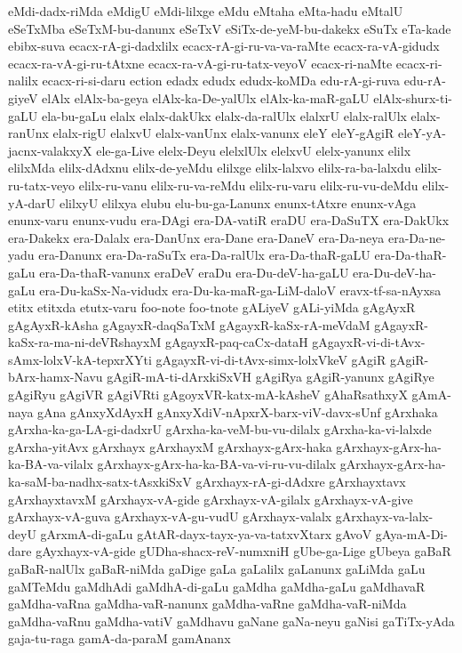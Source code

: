 {eMdi-dadx-riMda
eMdigU
eMdi-lilxge
eMdu
eMtaha
eMta-hadu
eMtalU
eSeTxMba
eSeTxM-bu-danunx
eSeTxV
eSiTx-de-yeM-bu-dakekx
eSuTx
eTa-kade
ebibx-suva
ecacx-rA-gi-dadxlilx
ecacx-rA-gi-ru-va-va-raMte
ecacx-ra-vA-gidudx
ecacx-ra-vA-gi-ru-tAtxne
ecacx-ra-vA-gi-ru-tatx-veyoV
ecacx-ri-naMte
ecacx-ri-nalilx
ecacx-ri-si-daru
ection
edadx
edudx
edudx-koMDa
edu-rA-gi-ruva
edu-rA-giyeV
elAlx
elAlx-ba-geya
elAlx-ka-De-yalUlx
elAlx-ka-maR-gaLU
elAlx-shurx-ti-gaLU
ela-bu-gaLu
elalx
elalx-dakUkx
elalx-da-ralUlx
elalxrU
elalx-ralUlx
elalx-ranUnx
elalx-rigU
elalxvU
elalx-vanUnx
elalx-vanunx
eleY
eleY-gAgiR
eleY-yA-jacnx-valakxyX
ele-ga-Live
elelx-Deyu
elelxlUlx
elelxvU
elelx-yanunx
elilx
elilxMda
elilx-dAdxnu
elilx-de-yeMdu
elilxge
elilx-lalxvo
elilx-ra-ba-lalxdu
elilx-ru-tatx-veyo
elilx-ru-vanu
elilx-ru-va-reMdu
elilx-ru-varu
elilx-ru-vu-deMdu
elilx-yA-darU
elilxyU
elilxya
elubu
elu-bu-ga-Lanunx
enunx-tAtxre
enunx-vAga
enunx-varu
enunx-vudu
era-DAgi
era-DA-vatiR
eraDU
era-DaSuTX
era-DakUkx
era-Dakekx
era-Dalalx
era-DanUnx
era-Dane
era-DaneV
era-Da-neya
era-Da-ne-yadu
era-Danunx
era-Da-raSuTx
era-Da-ralUlx
era-Da-thaR-gaLU
era-Da-thaR-gaLu
era-Da-thaR-vanunx
eraDeV
eraDu
era-Du-deV-ha-gaLU
era-Du-deV-ha-gaLu
era-Du-kaSx-Na-vidudx
era-Du-ka-maR-ga-LiM-daloV
eravx-tf-sa-nAyxsa
etitx
etitxda
etutx-varu
foo-note
foo-tnote
gALiyeV
gALi-yiMda
gAgAyxR
gAgAyxR-kAsha
gAgayxR-daqSaTxM
gAgayxR-kaSx-rA-meVdaM
gAgayxR-kaSx-ra-ma-ni-deVRshayxM
gAgayxR-paq-caCx-dataH
gAgayxR-vi-di-tAvx-sAmx-lolxV-kA-tepxrXYti
gAgayxR-vi-di-tAvx-simx-lolxVkeV
gAgiR
gAgiR-bArx-hamx-Navu
gAgiR-mA-ti-dArxkiSxVH
gAgiRya
gAgiR-yanunx
gAgiRye
gAgiRyu
gAgiVR
gAgiVRti
gAgoyxVR-katx-mA-kAsheV
gAhaRsathxyX
gAmA-naya
gAna
gAnxyXdAyxH
gAnxyXdiV-nApxrX-barx-viV-davx-sUnf
gArxhaka
gArxha-ka-ga-LA-gi-dadxrU
gArxha-ka-veM-bu-vu-dilalx
gArxha-ka-vi-lalxde
gArxha-yitAvx
gArxhayx
gArxhayxM
gArxhayx-gArx-haka
gArxhayx-gArx-ha-ka-BA-va-vilalx
gArxhayx-gArx-ha-ka-BA-va-vi-ru-vu-dilalx
gArxhayx-gArx-ha-ka-saM-ba-nadhx-satx-tAsxkiSxV
gArxhayx-rA-gi-dAdxre
gArxhayxtavx
gArxhayxtavxM
gArxhayx-vA-gide
gArxhayx-vA-gilalx
gArxhayx-vA-give
gArxhayx-vA-guva
gArxhayx-vA-gu-vudU
gArxhayx-valalx
gArxhayx-va-lalx-deyU
gArxmA-di-gaLu
gAtAR-dayx-tayx-ya-va-tatxvXtarx
gAvoV
gAya-mA-Di-dare
gAyxhayx-vA-gide
gUDha-shacx-reV-numxniH
gUbe-ga-Lige
gUbeya
gaBaR
gaBaR-nalUlx
gaBaR-niMda
gaDige
gaLa
gaLalilx
gaLanunx
gaLiMda
gaLu
gaMTeMdu
gaMdhAdi
gaMdhA-di-gaLu
gaMdha
gaMdha-gaLu
gaMdhavaR
gaMdha-vaRna
gaMdha-vaR-nanunx
gaMdha-vaRne
gaMdha-vaR-niMda
gaMdha-vaRnu
gaMdha-vatiV
gaMdhavu
gaNane
gaNa-neyu
gaNisi
gaTiTx-yAda
gaja-tu-raga
gamA-da-paraM
gamAnanx
}
